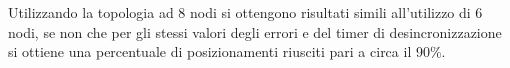 \documentclass[Lau,binding=0.6cm]{sapthesis}
\begin{document}
Utilizzando la topologia ad 8 nodi si ottengono risultati simili all'utilizzo di 6 nodi, se non che per gli stessi valori degli errori e del timer di desincronizzazione si ottiene una percentuale di posizionamenti riusciti pari a circa il 90\%.










\backmatter

\clearpage
\label{Bibliography}
\nocite{*}
\printbibliography
\end{document}
